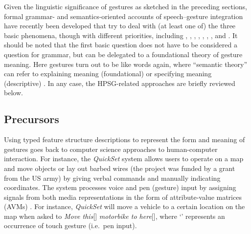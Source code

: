 \documentclass[output=paper,biblatex,babelshorthands,newtxmath,draftmode,colorlinks,citecolor=brown]{langscibook}
\begin{document}
Given the linguistic significance of gestures as sketched in the preceding sections, formal grammar- and semantics-oriented accounts of speech--gesture integration have recently been developed that try to deal with (at least one of) the three basic phenomena, though with different priorities, including
%
\citet{Alahverdzhieva:2013}, 
%
\citet{Alahverdzhieva:Lascarides:2010},
%
\cite{Ebert:2014:a},
%
\citet{Giorgolo:2010},
%
\citet{Giorgolo:Asudeh:2011},
%
\citet{Luecking:2013:a,Luecking:2016},
%
\citet{Rieser:2008,Rieser:2011,Rieser:2015},
%
\citet{Rieser:Poesio:2009} and
%
\citet{Schlenker:2018}.
%
It should be noted that the first basic question does not have to be considered a question for grammar, but can be delegated to a foundational theory of gesture meaning.
%
Here gestures turn out to be like words again, where \enquote{semantic theory} can refer to explaining meaning (foundational) or specifying meaning (descriptive) \citep[]{Lewis:1970}.
%
In any case, the HPSG-related approaches are briefly reviewed below.
%



\subsection{Precursors} 
\label{sec:precursors}

Using typed feature structure descriptions to represent the form and meaning of gestures goes back to computer science approaches to human-computer interaction. %
%
For instance, the \textit{QuickSet} system \citep{Cohen:et:al:1997} allows users to operate on a map and move objects or lay out barbed wires (the project was funded by a grant from the US army) by giving verbal commands and manually indicating coordinates.
%
The system processes voice and pen (gesture) input by assigning signals from both media representations in the form of attribute-value matrices (AVMs) \citep{Johnston:1998,Johnston:et:al:1997}.
%
For instance, \textit{QuickSet} will move a vehicle to a certain location on the map when asked to \emph{Move this}[\Pointing] \emph{motorbike to here}[\Pointing], where \enquote*{\Pointing} represents an occurrence of touch gesture (i.e.\ pen input). 
\end{document}

